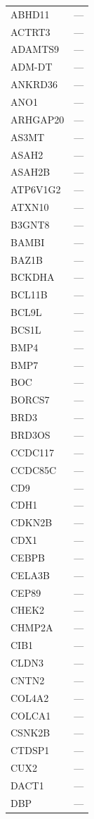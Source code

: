 \begin{longtable}{ll}
  ABHD11 & --- \\
  ACTRT3 & --- \\
  ADAMTS9 & --- \\
  ADM-DT & --- \\
  ANKRD36 & --- \\
  ANO1 & --- \\
  ARHGAP20 & --- \\
  AS3MT & --- \\
  ASAH2 & --- \\
  ASAH2B & --- \\
  ATP6V1G2 & --- \\
  ATXN10 & --- \\
  B3GNT8 & --- \\
  BAMBI & --- \\
  BAZ1B & --- \\
  BCKDHA & --- \\
  BCL11B & --- \\
  BCL9L & --- \\
  BCS1L & --- \\
  BMP4 & --- \\
  BMP7 & --- \\
  BOC & --- \\
  BORCS7 & --- \\
  BRD3 & --- \\
  BRD3OS & --- \\
  CCDC117 & --- \\
  CCDC85C & --- \\
  CD9 & --- \\
  CDH1 & --- \\
  CDKN2B & --- \\
  CDX1 & --- \\
  CEBPB & --- \\
  CELA3B & --- \\
  CEP89 & --- \\
  CHEK2 & --- \\
  CHMP2A & --- \\
  CIB1 & --- \\
  CLDN3 & --- \\
  CNTN2 & --- \\
  COL4A2 & --- \\
  COLCA1 & --- \\
  CSNK2B & --- \\
  CTDSP1 & --- \\
  CUX2 & --- \\
  DACT1 & --- \\
  DBP & --- \\

\end{longtable}

